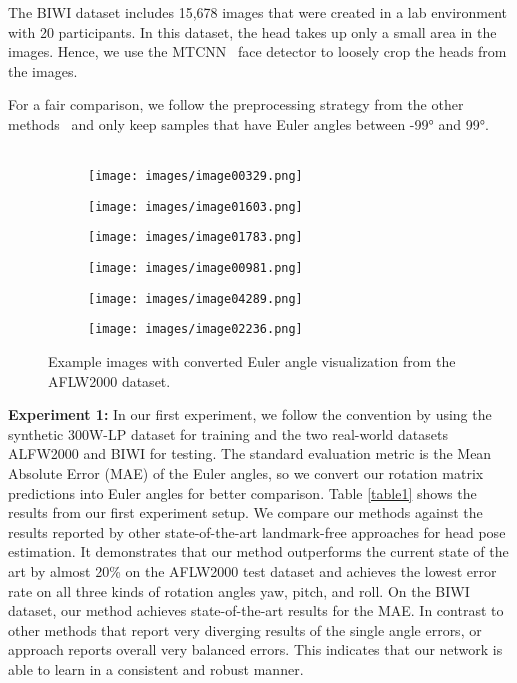 \documentclass{article}
\begin{document}
The BIWI dataset includes 15,678 images that were created in a lab environment with 20 participants. In this dataset, the head takes up only a small area in the images. Hence, we use the MTCNN~\cite{Zhang2016JointFD} face detector to loosely crop the heads from the images. 

For a fair comparison, we follow the preprocessing strategy from the other methods~\cite{Ruiz2018FineGrainedHP,Cao_2021_WACV} and only keep samples that have Euler angles between -99° and 99°.
\\
\\
\begin{figure}  \centering
  \begin{subfigure}{0.33\linewidth}
    \texttt{[image: images/image00329.png]}
\end{subfigure}
  \begin{subfigure}{0.32\linewidth}
    \texttt{[image: images/image01603.png]}
\end{subfigure}
  \begin{subfigure}{0.32\linewidth}
    \texttt{[image: images/image01783.png]}
\end{subfigure}
  \begin{subfigure}{0.32\linewidth}
    \texttt{[image: images/image00981.png]}
\end{subfigure}
    \begin{subfigure}{0.32\linewidth}
    \texttt{[image: images/image04289.png]}
\end{subfigure}
    \begin{subfigure}{0.32\linewidth}
    \texttt{[image: images/image02236.png]}
\end{subfigure}
  \caption{Example images with converted Euler angle visualization from the AFLW2000 dataset.}
  \label{fig:coffee}
  \label{qual}
\end{figure}
\textbf{Experiment 1:} In our first experiment, we follow the convention by using the synthetic 300W-LP dataset for training and the two real-world datasets ALFW2000 and BIWI for testing. The standard evaluation metric is the Mean Absolute Error (MAE) of the Euler angles, so we convert our rotation matrix predictions into Euler angles for better comparison. Table \ref{table1} shows the results from our first experiment setup. We compare our methods against the results reported by other state-of-the-art landmark-free approaches for head pose estimation. It demonstrates that our method outperforms the current state of the art by almost 20\% on the AFLW2000 test dataset and achieves the lowest error rate on all three kinds of rotation angles yaw, pitch, and roll. On the BIWI dataset, our method achieves state-of-the-art results for the MAE. In contrast to other methods that report very diverging results of the single angle errors, or approach reports overall very balanced errors. This indicates that our network is able to learn in a consistent and robust manner. 
\end{document}
